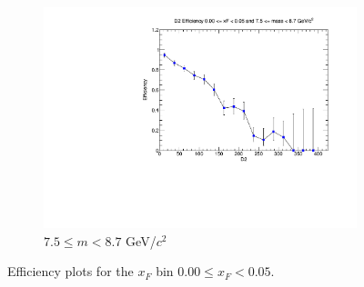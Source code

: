 \begin{figure}[p]
\begin{subfigure}[b]{0.32\textwidth}
        \includegraphics[width=\textwidth]{./kTrackerEfficiencyPlots/D2_Efficiency_xF0_mass10.pdf}
        \caption{$7.5 \leq m < 8.7$ GeV/$c^2$}
        \label{fig:xF0_mass10}
    \end{subfigure}
    \hfill
    \caption{Efficiency plots for the $x_F$ bin $0.00 \leq x_F < 0.05$.}
    \label{fig:xF0}
\end{figure}

\clearpage


